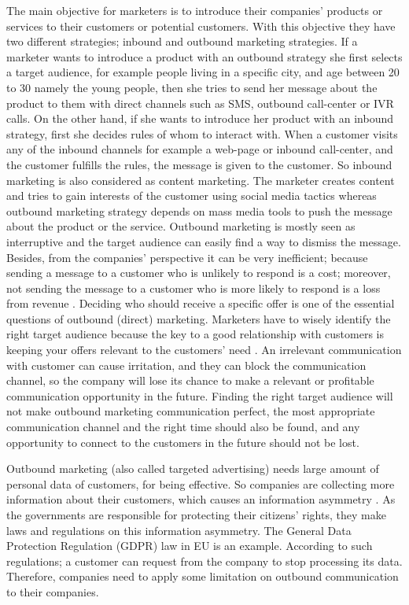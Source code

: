 \documentclass[11pt]{article}
\begin{document}
The main objective for marketers is to introduce their companies’ products or services to their customers or potential customers. With this objective they have two different strategies; inbound and outbound marketing strategies. If a marketer wants to introduce a product with an outbound strategy she first selects a target audience, for example people living in a specific city, and age between 20 to 30 namely the young people, then she tries to send her message about the product to them with direct channels such as SMS, outbound call-center or IVR calls. On the other hand, if she wants to introduce her product with an inbound strategy, first she decides rules of whom to interact with. When a customer visits any of the inbound channels for example a web-page or inbound call-center, and the customer fulfills the rules, the message is given to the customer. So inbound marketing is also considered as content marketing. The marketer creates content and tries to gain interests of the customer using social media tactics whereas outbound marketing strategy depends on mass media tools to push the message about the product or the service. Outbound marketing is mostly seen as interruptive and the target audience can easily find a way to dismiss the message. Besides, from the companies’ perspective it can be very inefficient; because sending a message to a customer who is unlikely to respond is a cost; moreover, not sending the message to a customer who is more likely to respond is a loss from revenue \citep{sarkar}. Deciding who should receive a specific offer is one of the essential questions of outbound (direct) marketing. Marketers have to wisely identify the right target audience because the key to a good relationship with customers is keeping your offers relevant to the customers’ need \citep{malthouse}. An irrelevant communication with customer can cause irritation, and they can block the communication channel, so the company will lose its chance to make a relevant or profitable communication opportunity in the future. Finding the right target audience will not make outbound marketing communication perfect, the most appropriate communication channel and the right time should also be found, and any opportunity to connect to the customers in the future should not be lost.

Outbound marketing (also called targeted advertising) needs large amount of personal data of customers, for being effective. So companies are collecting more information about their customers, which causes an information asymmetry \citep{waerdt}. As the governments are responsible for protecting their citizens’ rights, they make laws and regulations on this information asymmetry. The General Data Protection Regulation (GDPR) law in EU is an example. According to such regulations; a customer can request from the company to stop processing its data. Therefore, companies need to apply some limitation on outbound communication to their companies.
\end{document}
